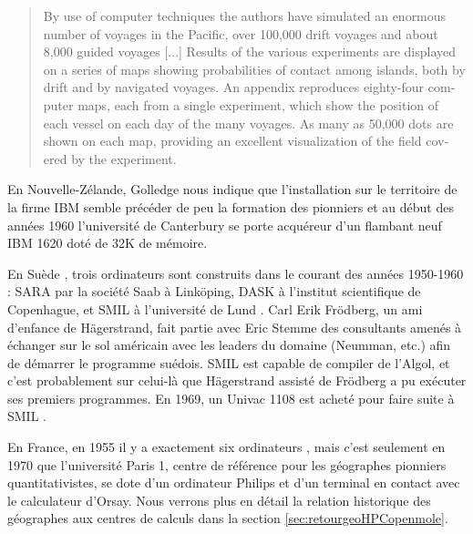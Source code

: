 \foreignblockquote{english}[\cite{Doran1974}]{ By use of computer techniques the authors have simulated an enormous number of voyages in the Pacific, over 100,000 drift voyages and about 8,000 guided voyages [...] Results of the various experiments are displayed on a series of maps showing probabilities of contact among islands, both by drift and by navigated voyages. An appendix reproduces eighty-four computer maps, each from a single experiment, which show the position of each vessel on each day of the many voyages. As many as 50,000 dots are shown on each map, providing an excellent visualization of the field covered by the experiment.}


En Nouvelle-Zélande, Golledge nous indique que l'installation sur le territoire de la firme IBM semble précéder de peu la formation des pionniers \autocite[94]{Bailly2000} et au début des années 1960 l'université de Canterbury se porte acquéreur d'un flambant neuf IBM 1620 doté de 32K de mémoire.


En Suède , trois ordinateurs sont construits dans le courant des années 1950-1960 : SARA par la société Saab à Linköping, DASK à l'institut scientifique de Copenhague, et SMIL à l'université de Lund \autocite{Persson2007}. Carl Erik Frödberg, un ami d'enfance de Hägerstrand, fait partie avec Eric Stemme des consultants amenés à échanger sur le sol américain avec les leaders du domaine (Neumman, etc.) afin de démarrer le programme suédois.  SMIL est capable de compiler de l'Algol, et c'est probablement sur celui-là que Hägerstrand assisté de Frödberg a pu exécuter ses premiers programmes. En 1969, un Univac 1108 est acheté pour faire suite à SMIL \autocite[33-34]{Lindgren2008}.

En France, en 1955 il y a exactement six ordinateurs \autocite[3]{Armatte2008}, mais c'est seulement en 1970 que l'université Paris 1, centre de référence pour les géographes pionniers quantitativistes, se dote d'un ordinateur Philips et d'un terminal en contact avec le calculateur d'Orsay. Nous verrons plus en détail la relation historique des géographes aux centres de calculs dans la section \ref{sec:retourgeoHPCopenmole}.

